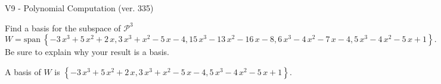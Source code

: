 \begin{exercise}
  \begin{exerciseTitle}V9 - Polynomial Computation (ver. 335)\end{exerciseTitle}
  \begin{exerciseStatement}
    Find a basis for the subspace of \(\mathcal{P}^3\) 
\[W=\mathrm{span}\ \left\{-3 \, x^{3} + 5 \, x^{2} + 2 \, x , 3 \, x^{3} + x^{2} - 5 \, x - 4 , 15 \, x^{3} - 13 \, x^{2} - 16 \, x - 8 , 6 \, x^{3} - 4 \, x^{2} - 7 \, x - 4 , 5 \, x^{3} - 4 \, x^{2} - 5 \, x + 1\right\}.\]
 Be sure to explain why your result is a basis.


  \end{exerciseStatement}
  \begin{exerciseAnswer}
   A basis of \(W\) is  \(\left\{-3 \, x^{3} + 5 \, x^{2} + 2 \, x , 3 \, x^{3} + x^{2} - 5 \, x - 4 , 5 \, x^{3} - 4 \, x^{2} - 5 \, x + 1\right\}\).
  


  \end{exerciseAnswer}
\end{exercise}